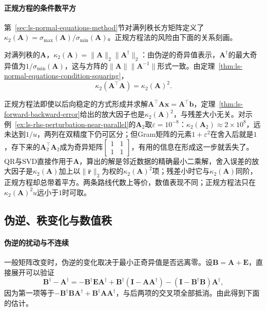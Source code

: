 \paragraph{正规方程的条件数平方}
第~\ref{sec:ls-normal-equations-method}节对满列秩长方矩阵定义了$\kappa_2(\bm A)=\sigma_{\max}(\bm A)/\sigma_{\min}(\bm A)$。正规方程法的风险由下面的关系刻画。

对满列秩的$\bm A$，$\kappa_2(\bm A)=\lVert\bm A\rVert_2\lVert\bm A^\dagger\rVert_2$：由伪逆的奇异值表示，$\bm A^\dagger$的最大奇异值为$1/\sigma_{\min}(\bm A)$，这与方阵的$\lVert\bm A\rVert\lVert\bm A^{-1}\rVert$形式一致。由定理~\ref{thm:ls-normal-equations-condition-squaring}，
\begin{equation}
 \kappa_2(\bm A^\top\bm A)=\kappa_2(\bm A)^2 .
 \label{eq:matrix-analysis-normal-equation-condition-square}
\end{equation}

正规方程法即使以后向稳定的方式形成并求解$\bm A^\top\bm A\bm x=\bm A^\top\bm b$，定理~\ref{thm:ls-forward-backward-error}给出的放大因子也是$\kappa_2(\bm A)^2$，与残差大小无关。对示例~\ref{ex:ls-rhs-perturbation-near-parallel}的$\bm A_2$取$\varepsilon=10^{-8}$：$\kappa_2(\bm A_2)\approx2\times10^8$，远未达到$1/u$，两列在双精度下仍可区分；但Gram矩阵的元素$1+\varepsilon^2$在舍入后就是$1$，存下来的$\bm A_2^\top\bm A_2$成为奇异矩阵$\left[\begin{smallmatrix}1&1\\1&1\end{smallmatrix}\right]$，有用的信息在形成这一步就丢失了。QR与SVD直接作用于$\bm A$，算出的解是邻近数据的精确最小二乘解，舍入误差的放大因子是$\kappa_2(\bm A)$加上以$\lVert\hat{\bm r}\rVert_2$为权的$\kappa_2(\bm A)^2$项；残差小时它与$\kappa_2(\bm A)$同阶，正规方程却总带着平方。两条路线代数上等价，数值表现不同；正规方程法只在$\kappa_2(\bm A)^2u$远小于$1$时可取。

\subsection{伪逆、秩变化与数值秩}
\label{sec:ls-pseudoinverse-rank-change}

\paragraph{伪逆的扰动与不连续}
一般矩阵改变时，伪逆的变化取决于最小正奇异值是否远离零。设$\bm B=\bm A+\bm E$，直接展开可以验证
\[
 \bm B^\dagger-\bm A^\dagger
 =-\bm B^\dagger\bm E\bm A^\dagger+\bm B^\dagger(\bm I-\bm A\bm A^\dagger)-(\bm I-\bm B^\dagger\bm B)\bm A^\dagger ,
\]
因为第一项等于$-\bm B^\dagger\bm B\bm A^\dagger+\bm B^\dagger\bm A\bm A^\dagger$，与后两项的交叉项全部抵消。由此得到下面的估计。

